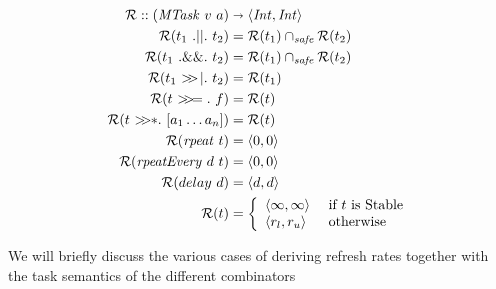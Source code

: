 \documentclass[runningheads]{llncs}
\begin{document}
\begin{align}
	\mathcal{R} :: (\mathit{MTask}~v~a)    & \shortrightarrow \langle \mathit{Int}, \mathit{Int} \rangle \notag \\
	\mathcal{R} (t_1~{.||.}~t_2)  & = \mathcal{R}(t_1) \cap_{\textit{safe}} \mathcal{R}(t_2) \label{R:or} \\
	\mathcal{R}(t_1~{.\&\&.}~t_2) & = \mathcal{R}(t_1) \cap_{\textit{safe}} \mathcal{R}(t_2) \label{R:and}\\
	\mathcal{R}(t_1~{>\!\!>\!|.}~t_2)   & = \mathcal{R}(t_1) \label{R:seq} \\
	\mathcal{R}(t~{>\!\!>\!=.}~f)       & = \mathcal{R}(t) \label{R:bind} \\
	\mathcal{R}(t~{>\!\!>\!\!*.}~[a_1 \ldots a_n]) & = \mathcal{R}(t) \label{R:step} \\
	\mathcal{R}(\mathit{rpeat}~t)             & = \langle 0, 0 \rangle \label{R:rpeat} \\
	\mathcal{R}(\mathit{rpeatEvery}~d~t)   & = \langle 0, 0 \rangle \label{R:rpeatevery} \\
	\mathcal{R}(delay~d) & = \langle d, d \rangle \label{R:delay} \\
	\mathcal{R}(t) & =
		\left\{%
			\begin{array}{ll}
				\langle \infty, \infty \rangle~& \text{if}~t~\text{is Stable} \\
				\langle r_l, r_u \rangle & \text{otherwise}
			\end{array}
		\right.\label{R:other}
\end{align}



We will briefly discuss the various cases of deriving refresh rates together with the task semantics of the different combinators
\end{document}
